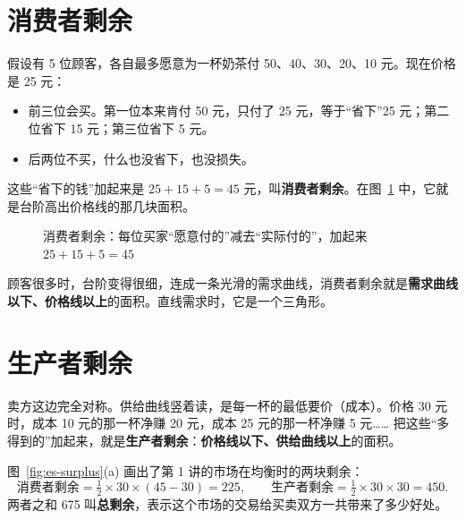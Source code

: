\section{消费者剩余}

假设有 5 位顾客，各自最多愿意为一杯奶茶付 50、40、30、20、10 元。现在价格是 25 元：
\begin{itemize}
  \item 前三位会买。第一位本来肯付 50 元，只付了 25 元，等于“省下”25 元；第二位省下 15 元；第三位省下 5 元。
  \item 后两位不买，什么也没省下，也没损失。
\end{itemize}
这些“省下的钱”加起来是 $25+15+5=45$ 元，叫\textbf{消费者剩余}。在图~\ref{fig:es-stair} 中，它就是台阶高出价格线的那几块面积。

\begin{figure}[!htbp]
\centering
{}
\caption{消费者剩余：每位买家“愿意付的”减去“实际付的”，加起来 $25+15+5=45$}
\label{fig:es-stair}
\end{figure}

顾客很多时，台阶变得很细，连成一条光滑的需求曲线，消费者剩余就是\textbf{需求曲线以下、价格线以上}的面积。直线需求时，它是一个三角形。

\section{生产者剩余}

卖方这边完全对称。供给曲线竖着读，是每一杯的最低要价（成本）。价格 30 元时，成本 10 元的那一杯净赚 20 元，成本 25 元的那一杯净赚 5 元……
把这些“多得到的”加起来，就是\textbf{生产者剩余}：\textbf{价格线以下、供给曲线以上}的面积。

图~\ref{fig:es-surplus}(a) 画出了第 1 讲的市场在均衡时的两块剩余：
\[
  \text{消费者剩余}=\tfrac12\times30\times(45-30)=225,\qquad
  \text{生产者剩余}=\tfrac12\times30\times30=450 .
\]
两者之和 675 叫\textbf{总剩余}，表示这个市场的交易给买卖双方一共带来了多少好处。

